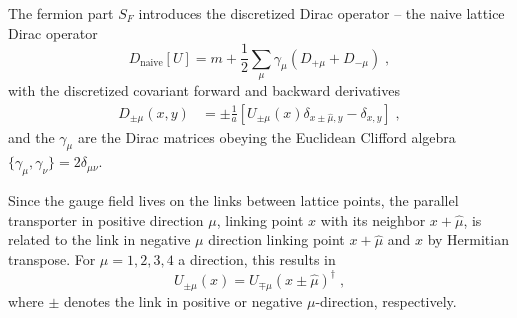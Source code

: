 The fermion part $S_F$ introduces the discretized Dirac operator -- the naive lattice Dirac operator
\begin{equation} \label{eq:D:naive}
D_{\text{naive}}[U] = m + \frac{1}{2} \sum_{\mu} \gamma_{\mu} \left( D_{+\mu} + D_{- \mu} \right) \;,
\end{equation}
with the discretized covariant forward and backward derivatives
\begin{align}
D_{\pm \mu}(x,y) &= \pm \frac{1}{a} \left[ U_{\pm \mu}(x) \delta_{x \pm \hat{\mu}, y} - \delta_{x,y} \right] \;,
\end{align}
and the $\gamma_{\mu}$ are the Dirac matrices obeying the Euclidean Clifford algebra $\{\gamma_{\mu}, \gamma_{\nu}\} = 2 \delta_{\mu \nu}$.

Since the gauge field lives on the links between lattice points, the parallel transporter in positive direction $\mu$, linking point $x$ with its neighbor $x + \hat{\mu}$, is related to the link in negative $\mu$ direction linking point $x + \hat{\mu}$ and $x$ by Hermitian transpose.
For $\mu=1,2,3,4$ a direction, this results in
\begin{equation}
U_{\pm \mu}(x) = U_{\mp \mu}(x \pm \hat{\mu})^{\dagger} \;,
\end{equation}
where $\pm$ denotes the link in positive or negative $\mu$-direction, respectively.

